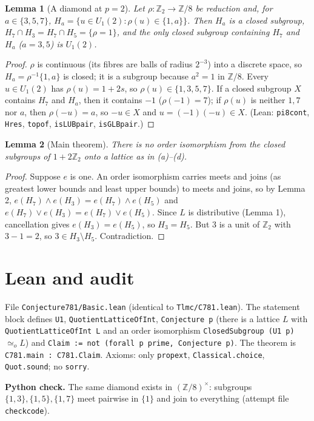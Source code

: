 \documentclass[11pt]{article}
\renewcommand{\_}{\oldus\allowbreak}
\newtheorem{lemma}{Lemma}
\newcommand{\Z}{\mathbb{Z}}
\begin{document}
\begin{lemma}[A diamond at $p=2$]
Let $\rho:\Z_2\to\Z/8$ be reduction and, for $a\in\{3,5,7\}$, $H_a=\{u\in U_1(2):\rho(u)\in\{1,a\}\}$. Then
$H_a$ is a closed subgroup, $H_7\cap H_3=H_7\cap H_5=\{\rho=1\}$, and the only closed subgroup containing
$H_7$ and $H_a$ ($a=3,5$) is $U_1(2)$.
\end{lemma}
\begin{proof}
$\rho$ is continuous (its fibres are balls of radius $2^{-3}$) into a discrete space, so $H_a=\rho^{-1}\{1,a\}$
is closed; it is a subgroup because $a^2=1$ in $\Z/8$. Every $u\in U_1(2)$ has $\rho(u)=1+2s$, so
$\rho(u)\in\{1,3,5,7\}$. If a closed subgroup $X$ contains $H_7$ and $H_a$, then it contains $-1$
($\rho(-1)=7$); if $\rho(u)$ is neither $1,7$ nor $a$, then $\rho(-u)=a$, so $-u\in X$ and $u=(-1)(-u)\in X$.
(Lean: \texttt{pi8\_cont}, \texttt{Hres}, \texttt{top\_of}, \texttt{isLUB\_pair}, \texttt{isGLB\_pair}.)
\end{proof}

\begin{lemma}[Main theorem]
There is no order isomorphism from the closed subgroups of $1+2\Z_2$ onto a lattice as in (a)--(d).
\end{lemma}
\begin{proof}
Suppose $e$ is one. An order isomorphism carries meets and joins (as greatest lower bounds and least upper
bounds) to meets and joins, so by Lemma 2, $e(H_7)\wedge e(H_3)=e(H_7)\wedge e(H_5)$ and
$e(H_7)\vee e(H_3)=e(H_7)\vee e(H_5)$. Since $L$ is distributive (Lemma 1), cancellation gives
$e(H_3)=e(H_5)$, so $H_3=H_5$. But $3$ is a unit of $\Z_2$ with $3-1=2$, so $3\in H_3\setminus H_5$. Contradiction.
\end{proof}

\section{Lean and audit}

File \texttt{Conjecture781/Basic.lean} (identical to \texttt{Tlmc/C781.lean}). The statement block defines
\texttt{U1}, \texttt{QuotientLatticeOfInt}, \texttt{Conjecture p} (there is a lattice $L$ with
\texttt{QuotientLatticeOfInt L} and an order isomorphism \texttt{ClosedSubgroup (U1 p)} $\simeq_o L$) and
\texttt{Claim := not (forall p prime, Conjecture p)}. The theorem is \texttt{C781.main : C781.Claim}.
Axioms: only \texttt{propext}, \texttt{Classical.choice}, \texttt{Quot.sound}; no \texttt{sorry}.

\textbf{Python check.} The same diamond exists in $(\Z/8)^\times$: subgroups $\{1,3\},\{1,5\},\{1,7\}$ meet
pairwise in $\{1\}$ and join to everything (attempt file \texttt{check\_code}).
\end{document}
